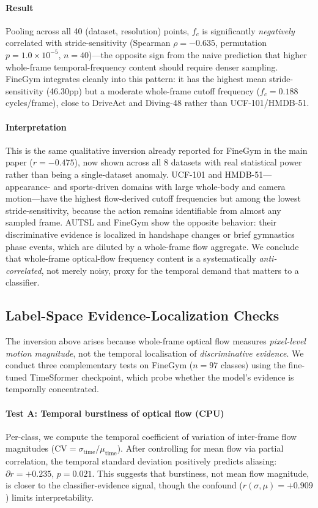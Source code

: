 \documentclass[a4paper, 10pt, conference, onecolumn]{ieeeconf}
\begin{document}
\paragraph{Result} Pooling across all 40 (dataset, resolution) points, $f_c$ is significantly \emph{negatively} correlated with stride-sensitivity (Spearman $\rho=-0.635$, permutation $p=1.0\times10^{-5}$, $n=40$)---the opposite sign from the naive prediction that higher whole-frame temporal-frequency content should require denser sampling. FineGym integrates cleanly into this pattern: it has the highest mean stride-sensitivity (46.30pp) but a moderate whole-frame cutoff frequency ($f_c=0.188$ cycles/frame), close to DriveAct and Diving-48 rather than UCF-101/HMDB-51.

\paragraph{Interpretation} This is the same qualitative inversion already reported for FineGym in the main paper ($r=-0.475$), now shown across all 8 datasets with real statistical power rather than being a single-dataset anomaly. UCF-101 and HMDB-51---appearance- and sports-driven domains with large whole-body and camera motion---have the highest flow-derived cutoff frequencies but among the lowest stride-sensitivity, because the action remains identifiable from almost any sampled frame. AUTSL and FineGym show the opposite behavior: their discriminative evidence is localized in handshape changes or brief gymnastics phase events, which are diluted by a whole-frame flow aggregate. We conclude that whole-frame optical-flow frequency content is a systematically \emph{anti-correlated}, not merely noisy, proxy for the temporal demand that matters to a classifier.

\subsection*{Label-Space Evidence-Localization Checks}

The inversion above arises because whole-frame optical flow measures \emph{pixel-level motion magnitude}, not the temporal localisation of \emph{discriminative evidence}. We conduct three complementary tests on FineGym ($n=97$ classes) using the fine-tuned TimeSformer checkpoint, which probe whether the model's evidence is temporally concentrated.

\paragraph{Test A: Temporal burstiness of optical flow (CPU)} Per-class, we compute the temporal coefficient of variation of inter-frame flow magnitudes ($\mathrm{CV} = \sigma_\mathrm{time}/\mu_\mathrm{time}$). After controlling for mean flow via partial correlation, the temporal standard deviation positively predicts aliasing: $\partial r = +0.235$, $p=0.021$. This suggests that burstiness, not mean flow magnitude, is closer to the classifier-evidence signal, though the confound ($r(\sigma,\mu)=+0.909$) limits interpretability.
\end{document}
